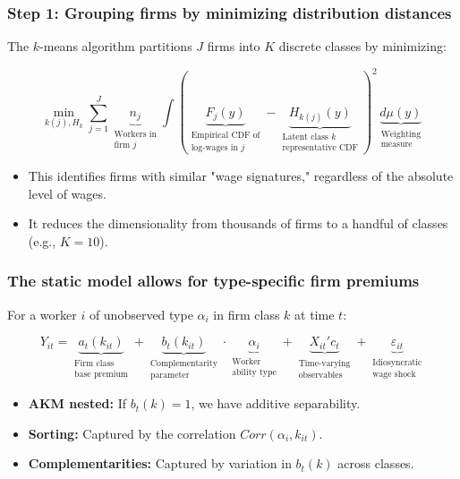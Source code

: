 \begin{frame}
    \frametitle{Step 1: Grouping firms by minimizing distribution distances}
    
    The $k$-means algorithm partitions $J$ firms into $K$ discrete classes by minimizing:
    
    \[ \min_{k(j), H_k} \sum_{j=1}^J \underbrace{n_j}_{\substack{\text{Workers in} \\ \text{firm } j}} \int \left( \underbrace{\widehat{F}_j(y)}_{\substack{\text{Empirical CDF of} \\ \text{log-wages in } j}} - \underbrace{H_{k(j)}(y)}_{\substack{\text{Latent class } k \\ \text{representative CDF}}} \right)^2 \underbrace{d\mu(y)}_{\substack{\text{Weighting} \\ \text{measure}}} \]
    
    \vspace{0.5cm}
    \begin{itemize}
        \item This identifies firms with similar "wage signatures," regardless of the absolute level of wages.
        \item It reduces the dimensionality from thousands of firms to a handful of classes (e.g., $K=10$).
    \end{itemize}
\end{frame}

\begin{frame}
    \frametitle{The static model allows for type-specific firm premiums}
    
    For a worker $i$ of unobserved type $\alpha_i$ in firm class $k$ at time $t$:
    
    \[ Y_{it} = \underbrace{a_t(k_{it})}_{\substack{\text{Firm class } \\ \text{base premium}}} + \underbrace{b_t(k_{it})}_{\substack{\text{Complementarity} \\ \text{parameter}}} \cdot \underbrace{\alpha_i}_{\substack{\text{Worker} \\ \text{ability type}}} + \underbrace{X_{it}'c_t}_{\substack{\text{Time-varying} \\ \text{observables}}} + \underbrace{\varepsilon_{it}}_{\substack{\text{Idiosyncratic} \\ \text{wage shock}}} \]
    
    \vspace{0.5cm}
    \begin{itemize}
        \item \textbf{AKM nested:} If $b_t(k) = 1$, we have additive separability.
        \item \textbf{Sorting:} Captured by the correlation $Corr(\alpha_i, k_{it})$.
        \item \textbf{Complementarities:} Captured by variation in $b_t(k)$ across classes.
    \end{itemize}
\end{frame}

